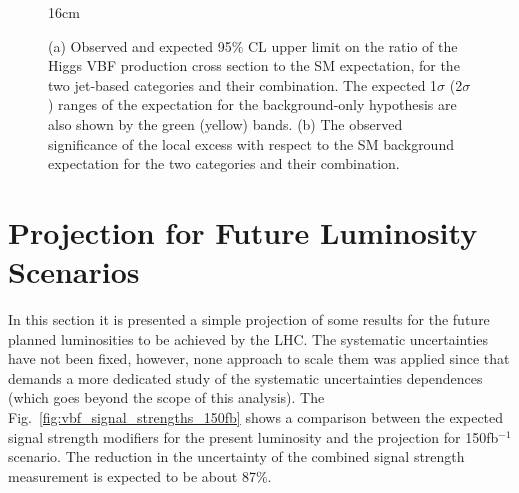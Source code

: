 \begin{figure}[hbtp]{16cm}
	\caption{(a) Observed and expected 95$\%$ CL upper limit on the ratio of the Higgs VBF production cross section to the SM expectation, for the two jet-based categories and their combination. The expected 1$\sigma$ (2$\sigma$) ranges of the expectation for the background-only hypothesis are also shown by the green (yellow) bands. (b) The observed significance of the local excess with respect to the SM background expectation for the two categories and their combination.}
	\centering
	\quad
	\label{fig:vbf_limits_significances}
\end{figure}

\section{Projection for Future Luminosity Scenarios}
In this section it is presented a simple projection of some results for the future planned luminosities to be achieved by the LHC. The systematic uncertainties have not been fixed, however, none approach to scale them was applied since that demands a more dedicated study of the systematic uncertainties dependences (which goes beyond the scope of this analysis). The Fig.~\ref{fig:vbf_signal_strengths_150fb} shows a comparison between the expected signal strength modifiers for the present luminosity and the projection for 150fb$^{-1}$ scenario. The reduction in the uncertainty of the combined signal strength measurement is expected to be about 87$\%$.

